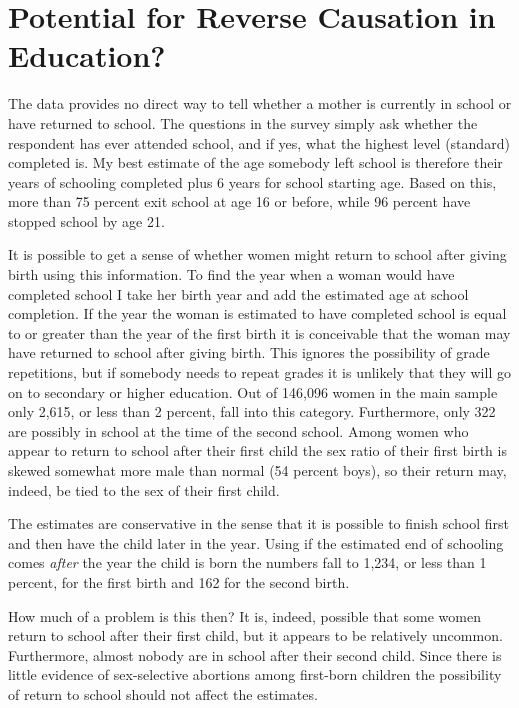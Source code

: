 \documentclass[12pt,letterpaper]{article}
\begin{document}
\clearpage
\newpage


\section{Potential for Reverse Causation in Education?}

The data provides no direct way to tell whether a mother is currently in
school or have returned to school.
The questions in the survey simply ask whether the respondent has ever
attended school, and if yes, what the highest level (standard) completed is.
My best estimate of the age somebody left school is therefore their years of
schooling completed plus 6 years for school starting age.
Based on this, more than 75 percent exit school at age 16 or before,
while 96 percent have stopped school by age 21.

It is possible to get a sense of whether women might return to school after 
giving birth using this information.
To find the year when a woman would have completed school I take her birth
year and add the estimated age at school completion.
If the year the woman is estimated to have completed school is equal to or greater than 
the year of the first birth it is conceivable that the woman may have returned to 
school after giving birth.
This ignores the possibility of grade repetitions, but if somebody needs to
repeat grades it is unlikely that they will go on to secondary or higher education.
Out of 146,096 women in the main sample only 2,615, or less than 2 percent, fall 
into this category.
Furthermore, only 322 are possibly in school at the time of the second school.
Among women who appear to return to school after their first child the sex ratio of their
first birth is skewed somewhat more male than normal (54 percent boys), so their 
return may, indeed, be tied to the sex of their first child.

The estimates are conservative in the sense that it is possible to finish school 
first and then have the child later in the year.
Using if the estimated end of schooling comes \emph{after} the year the child 
is born the numbers fall to 1,234, or less than 1 percent, for
the first birth and 162 for the second birth.

How much of a problem is this then?
It is, indeed, possible that some women return to school after their first child,
but it appears to be relatively  uncommon.
Furthermore, almost nobody are in school after their second child.
Since there is little evidence of sex-selective abortions among first-born children
the possibility of return to school should not affect the estimates.
\end{document}
